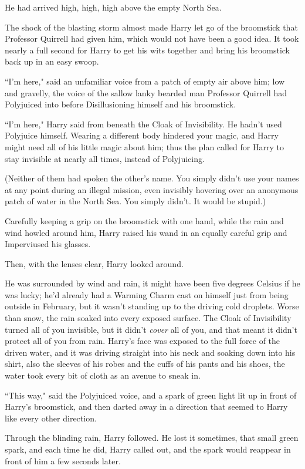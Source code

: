 He had arrived high, high, high above the empty North Sea.

The shock of the blasting storm almost made Harry let go of the broomstick that Professor Quirrell had given him, which would not have been a good idea. It took nearly a full second for Harry to get his wits together and bring his broomstick back up in an easy swoop.

``I'm here," said an unfamiliar voice from a patch of empty air above him; low and gravelly, the voice of the sallow lanky bearded man Professor Quirrell had Polyjuiced into before Disillusioning himself and his broomstick.

``I'm here," Harry said from beneath the Cloak of Invisibility. He hadn't used Polyjuice himself. Wearing a different body hindered your magic, and Harry might need all of his little magic about him; thus the plan called for Harry to stay invisible at nearly all times, instead of Polyjuicing.

(Neither of them had spoken the other's name. You simply didn't use your names at any point during an illegal mission, even invisibly hovering over an anonymous patch of water in the North Sea. You simply didn't. It would be stupid.)

Carefully keeping a grip on the broomstick with one hand, while the rain and wind howled around him, Harry raised his wand in an equally careful grip and Imperviused his glasses.

Then, with the lenses clear, Harry looked around.

He was surrounded by wind and rain, it might have been five degrees Celsius if he was lucky; he'd already had a Warming Charm cast on himself just from being outside in February, but it wasn't standing up to the driving cold droplets. Worse than snow, the rain soaked into every exposed surface. The Cloak of Invisibility turned all of you invisible, but it didn't \emph{cover} all of you, and that meant it didn't protect all of you from rain. Harry's face was exposed to the full force of the driven water, and it was driving straight into his neck and soaking down into his shirt, also the sleeves of his robes and the cuffs of his pants and his shoes, the water took every bit of cloth as an avenue to sneak in.

``This way," said the Polyjuiced voice, and a spark of green light lit up in front of Harry's broomstick, and then darted away in a direction that seemed to Harry like every other direction.

Through the blinding rain, Harry followed. He lost it sometimes, that small green spark, and each time he did, Harry called out, and the spark would reappear in front of him a few seconds later.

